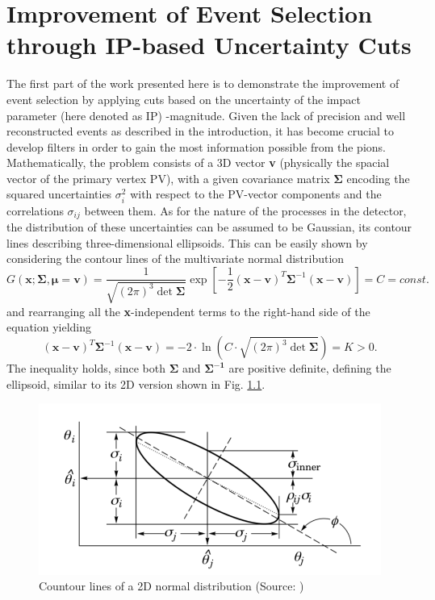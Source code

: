 \chapter{Improvement of Event Selection through IP-based Uncertainty Cuts} %

\label{Chapter4} %


The first part of the work presented here is to demonstrate the improvement of event selection by applying cuts based on the uncertainty of the impact parameter (here denoted as IP) -magnitude. Given the lack of precision and well reconstructed events as described in the introduction, it has become crucial to develop filters in order to gain the most information possible from the pions.\\
Mathematically, the problem consists of a 3D vector \textbf{v} (physically the spacial vector of the primary vertex PV), with a given covariance matrix $\boldsymbol{\Sigma}$ encoding the squared uncertainties $\sigma^2_i$ with respect to the PV-vector components and the correlations $\sigma_{ij}$ between them. As for the nature of the processes in the detector, the distribution of these uncertainties can be assumed to be Gaussian, its contour lines describing three-dimensional ellipsoids. This can be easily shown by considering the contour lines of the multivariate normal distribution
\begin{equation}
	G(\boldsymbol{x};\boldsymbol{\Sigma},\boldsymbol{\mu}=\boldsymbol{v}) = \frac{1}{\sqrt{(2\pi)^3\det{\boldsymbol{\Sigma}}}}\exp{\left[-\frac{1}{2}(\boldsymbol{x}-\boldsymbol{v})^T \boldsymbol{\Sigma}^{-1}(\boldsymbol{x}-\boldsymbol{v}) \right]} = C = const.
\end{equation}
and rearranging all the \textbf{x}-independent terms to the right-hand side of the equation yielding
\begin{equation}
	(\boldsymbol{x}-\boldsymbol{v})^T \boldsymbol{\Sigma}^{-1}(\boldsymbol{x}-\boldsymbol{v}) = -2\cdot\ln\left(C\cdot\sqrt{(2\pi)^3\det{\boldsymbol{\Sigma}}}\right)=K>0.
\end{equation}
The inequality holds, since both $\boldsymbol{\Sigma}$ and $\boldsymbol{\Sigma^{-1}}$ are positive definite, defining the ellipsoid, similar to its 2D version shown in Fig. \ref{fig:ellipse}.
\begin{figure}[h]
	\centering
	\includegraphics[width=0.7\linewidth]{Figures/ellipsoid}
	\caption{Countour lines of a 2D normal distribution (Source: \parencite{PDG_source})}
	\label{fig:ellipse}
\end{figure}\\
